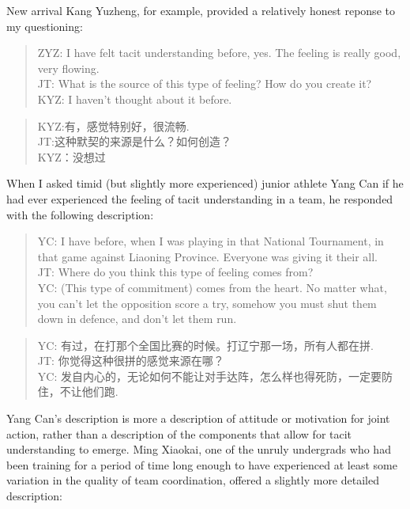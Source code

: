 \begin{CJK}{UTF8}{gbsn}
New arrival Kang Yuzheng, for example, provided a relatively honest reponse to my questioning:

\begin{quotation}
  ZYZ: I have felt tacit understanding before, yes.  The feeling is really good, very flowing. \\
  JT: What is the source of this type of feeling? How do you create it? \\
  KYZ: I haven't thought about it before.
\end{quotation}

\begin{quotation}
  KYZ:有，感觉特别好，很流畅. \\
  JT:这种默契的来源是什么？如何创造？\\
  KYZ：没想过
\end{quotation}


When I asked timid (but slightly more experienced) junior athlete Yang Can if he had ever experienced the feeling of tacit understanding in a team, he responded with the following description:

    \begin{quotation}
      YC: I have before, when I was playing in that National Tournament, in that game against Liaoning Province.  Everyone was giving it their all. \\
      JT: Where do you think this type of feeling comes from? \\
      YC: (This type of commitment) comes from the heart. No matter what, you can’t let the opposition score a try, somehow you must shut them down in defence, and don’t let them run.
    \end{quotation}

    \begin{quotation}
      YC: 有过，在打那个全国比赛的时候。打辽宁那一场，所有人都在拼.\\
      JT: 你觉得这种很拼的感觉来源在哪？\\
      YC: 发自内心的，无论如何不能让对手达阵，怎么样也得死防，一定要防住，不让他们跑.
    \end{quotation}

Yang Can's description is more a description of attitude or motivation for joint action, rather than a description of the components that allow for tacit understanding to emerge.  Ming Xiaokai, one of the unruly undergrads who had been training for a period of time long enough to have experienced at least some variation in the quality of team coordination, offered a slightly more detailed description:


\end{CJK}
